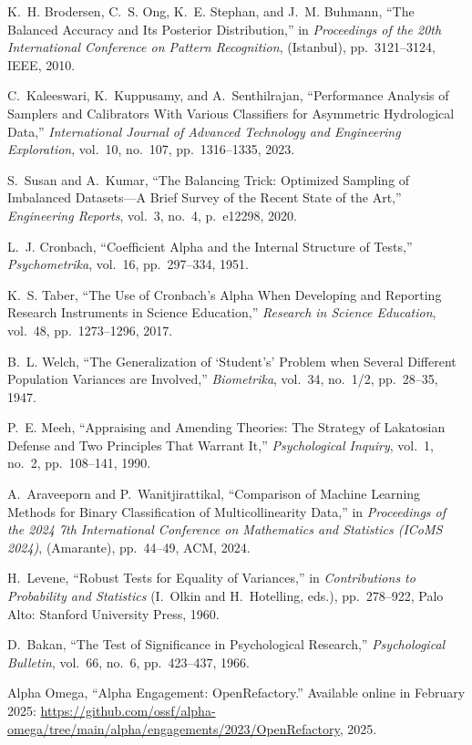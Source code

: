 \documentclass[5p, twocolumn, numbers, sort]{elsarticle}
\begin{document}
\begin{thebibliography}{10}
K.~H. Brodersen, C.~S. Ong, K.~E. Stephan, and J.~M. Buhmann, ``{T}he
  {B}alanced {A}ccuracy and {I}ts {P}osterior {D}istribution,'' in {\em
  Proceedings of the 20th International Conference on Pattern Recognition},
  (Istanbul), pp.~3121--3124, IEEE, 2010.

C.~Kaleeswari, K.~Kuppusamy, and A.~Senthilrajan, ``{P}erformance {A}nalysis of
  {S}amplers and {C}alibrators {W}ith {V}arious {C}lassifiers for {A}symmetric
  {H}ydrological {D}ata,'' {\em International Journal of Advanced Technology
  and Engineering Exploration}, vol.~10, no.~107, pp.~1316--1335, 2023.

S.~Susan and A.~Kumar, ``{T}he {B}alancing {T}rick: {O}ptimized {S}ampling of
  {I}mbalanced {D}atasets---{A} {B}rief {S}urvey of the {R}ecent {S}tate of the
  {A}rt,'' {\em Engineering Reports}, vol.~3, no.~4, p.~e12298, 2020.

L.~J. Cronbach, ``{C}oefficient {A}lpha and the {I}nternal {S}tructure of
  {T}ests,'' {\em Psychometrika}, vol.~16, pp.~297--334, 1951.

K.~S. Taber, ``{T}he {U}se of {C}ronbach's {A}lpha {W}hen {D}eveloping and
  {R}eporting {R}esearch {I}nstruments in {S}cience {E}ducation,'' {\em
  Research in Science Education}, vol.~48, pp.~1273--1296, 2017.

B.~L. Welch, ``{T}he {G}eneralization of `{S}tudent's' {P}roblem when {S}everal
  {D}ifferent {P}opulation {V}ariances are {I}nvolved,'' {\em Biometrika},
  vol.~34, no.~1/2, pp.~28--35, 1947.

P.~E. Meeh, ``{A}ppraising and {A}mending {T}heories: {T}he {S}trategy of
  {L}akatosian {D}efense and {T}wo {P}rinciples {T}hat {W}arrant {I}t,'' {\em
  Psychological Inquiry}, vol.~1, no.~2, pp.~108--141, 1990.

A.~Araveeporn and P.~Wanitjirattikal, ``{C}omparison of {M}achine {L}earning
  {M}ethods for {B}inary {C}lassification of {M}ulticollinearity {D}ata,'' in
  {\em Proceedings of the 2024 7th International Conference on Mathematics and
  Statistics (ICoMS 2024)}, (Amarante), pp.~44--49, ACM, 2024.

H.~Levene, ``{R}obust {T}ests for {E}quality of {V}ariances,'' in {\em
  {C}ontributions to {P}robability and {S}tatistics} (I.~Olkin and
  H.~Hotelling, eds.), pp.~278--922, Palo Alto: Stanford University Press,
  1960.

D.~Bakan, ``{T}he {T}est of {S}ignificance in {P}sychological {R}esearch,''
  {\em Psychological Bulletin}, vol.~66, no.~6, pp.~423--437, 1966.

{Alpha Omega}, ``{A}lpha {E}ngagement: {O}pen{R}efactory.'' {A}vailable online
  in February 2025:
  \url{https://github.com/ossf/alpha-omega/tree/main/alpha/engagements/2023/OpenRefactory},
  2025.

\end{thebibliography}
\end{document}
